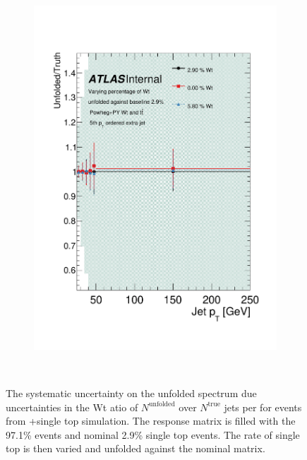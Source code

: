 \begin{figure}
\begin{subfigure}[]{0.3\textwidth}
\includegraphics[width=\textwidth]{fig/Wt/TruthRatioJet4.pdf}
\end{subfigure}
~
\caption{The systematic uncertainty on the unfolded spectrum due uncertainties in the
Wt
atio of $N^{\textrm{unfolded}}$ over $N^{\textrm{true}}$ jets per \GeV for events from \ttbar+single top simulation. The response matrix is filled with the 97.1\% \ttbar events and nominal 2.9\% single top events. The rate of single top is then varied and unfolded against the nominal matrix.}
\label{fig:WtRat}
\end{figure}
\clearpage
